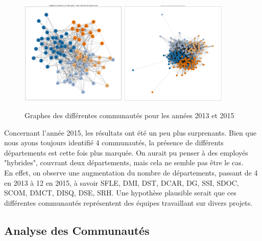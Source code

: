 \documentclass{article}
\begin{document}
\begin{figure}[!h]
    \centering
    \includegraphics[width=0.45\textwidth]{assets/communaute/communaute_2013.png}
    \hfill
    \includegraphics[width=0.45\textwidth]{assets/communaute/communaute_2015.png}
    \caption{Graphes des différentes communautés pour les années 2013 et 2015}
    \label{fig:communaute_parallel}
\end{figure}


Concernant l'année 2015, les résultats ont été un peu plus surprenants. Bien que nous ayons toujours identifié 4 communautés, la présence de différents départements est cette fois plus marquée. On aurait pu penser à des employés "hybrides", couvrant deux départements, mais cela ne semble pas être le cas. \\

En effet, on observe une augmentation du nombre de départements, passant de 4 en 2013 à 12 en 2015, à savoir SFLE, DMI, DST, DCAR, DG, SSI, SDOC, SCOM, DMCT, DISQ, DSE, SRH. Une hypothèse plausible serait que ces différentes communautés représentent des équipes travaillant sur divers projets. \\

\subsection{Analyse des Communautés}
\end{document}

